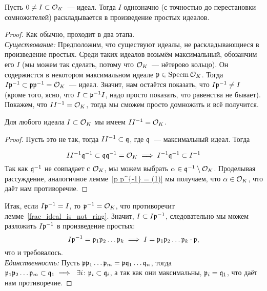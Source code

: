 	\begin{theorem}\label{ideal_factorization}
		Пусть $0 \neq I \subset \mathcal{O}_{K}$~--- идеал. Тогда $I$ однозначно (с точностью до перестановки сомножителей) раскладывается в произведение простых идеалов. 
	\end{theorem}

	\begin{proof} Как обычно, проходит в два этапа. \\
		\emph{Существование:} Предположим, что существуют идеалы, не раскладывающиеся в произведение простых. Среди таких идеалов возьмём максимальный, обозанчим его $I$ (мы можем так сделать, потому что $\mathcal{O}_{K}$~--- нётерово кольцо). Он содержистся в некотором максимальном идеале $\mathfrak{p} \in \operatorname{Specm}{\mathcal{O}_{K}}$. Тогда $I \mathfrak{p}^{-1} \subset \mathfrak{p} \mathfrak{p}^{-1} = \mathcal{O}_{K}$~--- идеал. Значит, нам остаётся показать, что $I \mathfrak{p}^{-1} \neq I$ (кроме того, ясно, что $I \subset \mathfrak{p}^{-1}I$, надо просто показать, что равенства не бывает). Покажем, что $I I^{-1} = \mathcal{O}_{K}$, тогда мы сможем просто домножить и всё получится. 

		\begin{lemma} 
			Для любого идеала $I \subset \mathcal{O}_{K}$ мы имеем $I I^{-1} = \mathcal{O}_{K}$. 
		\end{lemma}

		\begin{proof}
			Пусть это не так, тогда $I I^{-1} \subset \mathfrak{q}$, где $\mathfrak{q}$~--- максимальный идеал. Тогда

			\[ 
				I I^{-1} \mathfrak{q}^{-1} \subset \mathfrak{q} \mathfrak{q}^{-1} = \mathcal{O}_{K} \implies  I^{-1}\mathfrak{q}^{-1} \subset I^{-1} \] 
			Так как $\mathfrak{q}^{-1}$ не совпадает с $\mathcal{O}_{K}$, мы можем выбрать $\alpha \in \mathfrak{q}^{-1}\setminus \mathcal{O}_{K}$. Проделывая рассуждение, аналогичное лемме~\ref{p p^{-1} = (1)} мы получаем, что $\alpha \in \mathcal{O}_{K}$, что даёт нам противоречие. 
		\end{proof}

		Итак, если $I \mathfrak{p}^{-1} = I$, то $\mathfrak{p}^{-1} = \mathcal{O}_{K}$, что противоречит лемме~\ref{frac_ideal_is_not_ring}. Значит, $I \subset I\mathfrak{p}^{-1} $, следовательно мы можем разложить $I \mathfrak{p}^{-1}$ в произведение простых:
		\[
			I \mathfrak{p}^{-1} = \mathfrak{p}_{1} \mathfrak{p}_{2} \ldots \mathfrak{p}_{k} \implies I = \mathfrak{p}_{1} \mathfrak{p}_{2} \ldots \mathfrak{p}_{k} \cdot \mathfrak{p}, 
		\]
		что и требовалось. \\
		\emph{Единственность:} Пусть $\mathfrak{p} \mathfrak{p}_{1} \ldots \mathfrak{p}_{m} = \mathfrak{p} \mathfrak{q}_{1} \ldots \mathfrak{q}_{n}$, тогда $\mathfrak{p}_{1} \mathfrak{p}_{2} \ldots \mathfrak{p}_{m} \subset \mathfrak{q}_{1} \implies \ \exists i\colon \mathfrak{p}_{i} \subset \mathfrak{q}_{i}$, а так как они максимальны, $\mathfrak{p}_{i} = \mathfrak{q}_{1}$, что даёт нам противоречие. 
	\end{proof}

